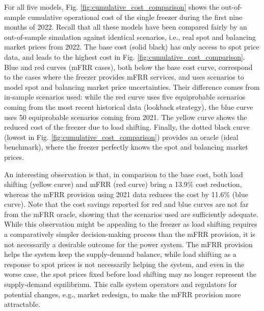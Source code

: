 \documentclass[11pt,a4paper]{article}
\begin{document}
For all five models, Fig. \ref{fig:cumulative_cost_comparison} shows the out-of-sample cumulative operational cost of the single freezer during the first nine months of 2022. Recall that all these models have been compared fairly by an out-of-sample simulation against identical scenarios, i.e., real spot and balancing market prices from 2022.
The base cost (solid black) has only access to spot price data, and leads to the highest cost in Fig. \ref{fig:cumulative_cost_comparison}.
Blue and red curves (mFRR cases), both below the base cost curve, correspond to the cases where the freezer provides mFRR services, and uses scenarios to model spot and balancing market price uncertainties. Their difference comes from in-sample scenarios used: while the red curve uses five equiprobable scenarios coming from the most recent historical data (lookback strategy), the blue curve uses 50 equiprobable scenarios coming from 2021. The yellow curve shows the reduced cost of the freezer due to  load shifting. Finally, the dotted black curve (lowest in Fig. \ref{fig:cumulative_cost_comparison}) provides an oracle (ideal benchmark), where the freezer perfectly knows the spot and balancing market prices.

An interesting observation is that, in comparison to the base cost, both load shifting (yellow curve) and mFRR (red curve) bring a 13.9\% cost reduction, whereas the mFRR provision using 2021 data reduces the cost by  11.6\% (blue curve). Note that the cost savings reported for red and blue curves are not far  from the mFRR oracle, showing that the scenarios used are sufficiently adequate.
While this observation might be appealing to the freezer as load shifting requires a comparatively simpler decision-making process than the mFRR provision, it is not necessarily a desirable outcome for the power system. The mFRR  provision helps the system keep the supply-demand balance, while load shifting as a response to spot prices is not necessarily helping the system, and even in the worse case, the spot prices fixed before load shifting may no longer represent the supply-demand equilibrium. This calls system operators and regulators for potential changes, e.g., market redesign, to make the mFRR  provision more attractable.
\end{document}
